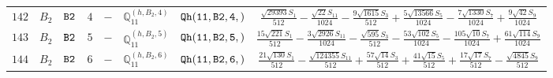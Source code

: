 \documentclass[fleqn,8pt]{jsarticle}
\begin{document}
\begin{table}[ht!]
\begin{center}
\begin{tabular}{cccccccc}
$ 142 $ & $ B_{2} $ & $ {\tt B2} $ & $ 4 $ & $ - $ & $ \mathbb{Q}_{11}^{(h,B_{2},4)} $ & $ {\tt Qh(11,B2,4,)} $ & $ \frac{\sqrt{29393} S_{1}}{512} - \frac{\sqrt{22} S_{11}}{1024} - \frac{9 \sqrt{1615} S_{3}}{512} + \frac{5 \sqrt{13566} S_{5}}{1024} - \frac{7 \sqrt{1330} S_{7}}{1024} + \frac{9 \sqrt{42} S_{9}}{1024} $ \\
$ 143 $ & $ B_{2} $ & $ {\tt B2} $ & $ 5 $ & $ - $ & $ \mathbb{Q}_{11}^{(h,B_{2},5)} $ & $ {\tt Qh(11,B2,5,)} $ & $ \frac{15 \sqrt{221} S_{1}}{512} - \frac{3 \sqrt{2926} S_{11}}{1024} - \frac{\sqrt{595} S_{3}}{512} - \frac{53 \sqrt{102} S_{5}}{1024} - \frac{105 \sqrt{10} S_{7}}{1024} + \frac{61 \sqrt{114} S_{9}}{1024} $ \\
$ 144 $ & $ B_{2} $ & $ {\tt B2} $ & $ 6 $ & $ - $ & $ \mathbb{Q}_{11}^{(h,B_{2},6)} $ & $ {\tt Qh(11,B2,6,)} $ & $ \frac{21 \sqrt{130} S_{1}}{512} - \frac{\sqrt{124355} S_{11}}{512} + \frac{57 \sqrt{14} S_{3}}{512} + \frac{41 \sqrt{15} S_{5}}{512} + \frac{17 \sqrt{17} S_{7}}{512} - \frac{\sqrt{4845} S_{9}}{512} $ \\
 \hline \hline
\end{tabular}
\end{center}
\end{table}
\end{document}
